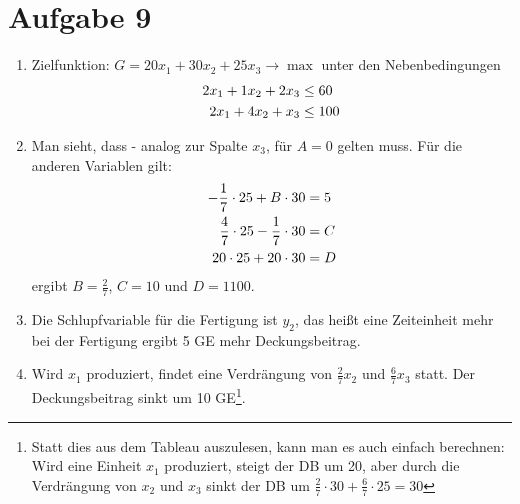 \documentclass{article}
\begin{document}
	\section*{Aufgabe 9}
		\begin{enumerate}[label=(\alph*)]
		\item Zielfunktion: $G=20x_1 + 30x_2 + 25x_3 \to\max$ unter den Nebenbedingungen
		\begin{align}
			2x_1 + 1x_2 + 2x_3 &\le 60 \notag \\
			2x_1 + 4x_2 + x_3 &\le 100 \notag
		\end{align}
		\item Man sieht, dass - analog zur Spalte $x_3$, für $A=0$ gelten muss. Für die anderen Variablen gilt:
		\begin{align}
			-\frac{1}{7}\cdot 25 + B\cdot 30 &= 5 \notag \\
			\frac{4}{7}\cdot 25 - \frac{1}{7}\cdot 30 &= C \notag \\
			20\cdot 25 + 20\cdot 30 &= D \notag
		\end{align}
		ergibt $B=\frac{2}{7}$, $C=10$ und $D=1100$.
		\item Die Schlupfvariable für die Fertigung ist $y_2$, das heißt eine Zeiteinheit mehr bei der Fertigung ergibt 5 GE mehr Deckungsbeitrag.
		\item Wird $x_1$ produziert, findet eine Verdrängung von $\frac{2}{7}x_2$ und $\frac{6}{7}x_3$ statt. Der Deckungsbeitrag sinkt um 10 GE\footnote{Statt dies aus dem Tableau auszulesen, kann man es auch einfach berechnen: Wird eine Einheit $x_1$ produziert, steigt der DB um 20, aber durch die Verdrängung von $x_2$ und $x_3$ sinkt der DB um $\frac{2}{7}\cdot 30 + \frac{6}{7}\cdot 25=30$}. 
	\end{enumerate}
	
\end{document}
